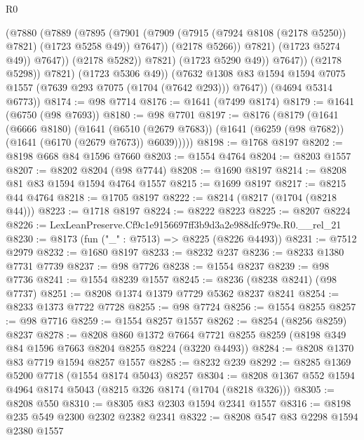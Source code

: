 \begin{lexlean}{R0}
\begin{coremodule}
                              (@7880
                                (@7889
                                  (@7895
                                    (@7901
                                      (@7909
                                        (@7915 (@7924 @8108 (@2178 @5250)) @7821)
                                        (@1723 @5258 @49))
                                      @7647))
                                  (@2178 @5266))
                                @7821)
                              (@1723 @5274 @49))
                            @7647))
                        (@2178 @5282))
                      @7821)
                    (@1723 @5290 @49))
                  @7647))
              (@2178 @5298))
            @7821)
          (@1723 @5306 @49))
        (@7632 @1308 @83 @1594 @1594 @7075 @1557 (@7639 @293 @7075 (@1704 (@7642 @293))) @7647))
      (@4694 @5314 @6773))
@8174 := @98 @7714
@8176 := @1641 (@7499 @8174)
@8179 := @1641 (@6750 (@98 @7693))
@8180 := @98 @7701
@8197 := @8176
    (@8179
      (@1641
        (@6666 @8180)
        (@1641
          (@6510 (@2679 @7683))
          (@1641 (@6259 (@98 @7682)) (@1641 (@6170 (@2679 @7673)) @6039)))))
@8198 := @1768 @8197
@8202 := @8198 @668 @84 @1596 @7660
@8203 := @1554 @4764
@8204 := @8203 @1557
@8207 := @8202 @8204 (@98 @7744)
@8208 := @1690 @8197
@8214 := @8208 @81 @83 @1594 @1594 @4764 @1557
@8215 := @1699 @8197
@8217 := @8215 @44 @4764
@8218 := @1705 @8197
@8222 := @8214 (@8217 (@1704 (@8218 @44)))
@8223 := @1718 @8197
@8224 := @8222 @8223
@8225 := @8207 @8224
@8226 := LexLeanPreserve.Cf9c1e9156697ff3b9d3a2e988dfc979e.R0.__rel_21
@8230 := @8173 (fun ("_" : @7513) => @8225 (@8226 @4493))
@8231 := @7512 @2979
@8232 := @1680 @8197
@8233 := @8232 @237
@8236 := @8233 @1380 @7731 @7739
@8237 := @98 @7726
@8238 := @1554 @8237
@8239 := @98 @7736
@8241 := @1554 @8239 @1557
@8245 := @8236 (@8238 @8241) (@98 @7737)
@8251 := @8208 @1374 @1379 @7729 @5362 @8237 @8241
@8254 := @8233 @1373 @7722 @7728
@8255 := @98 @7724
@8256 := @1554 @8255
@8257 := @98 @7716
@8259 := @1554 @8257 @1557
@8262 := @8254 (@8256 @8259) @8237
@8278 := @8208
    @860
    @1372
    @7664
    @7721
    @8255
    @8259
    (@8198 @349 @84 @1596 @7663 @8204 @8255 @8224 (@3220 @4493))
@8284 := @8208 @1370 @83 @7719 @1594 @8257 @1557
@8285 := @8232 @239
@8292 := @8285 @1369 @5200 @7718 (@1554 @8174 @5043) @8257
@8304 := @8208 @1367 @552 @1594 @4964 @8174 @5043 (@8215 @326 @8174 (@1704 (@8218 @326)))
@8305 := @8208 @550
@8310 := @8305 @83 @2303 @1594 @2341 @1557
@8316 := @8198 @235 @549 @2300 @2302 @2382 @2341
@8322 := @8208 @547 @83 @2298 @1594 @2380 @1557

\end{coremodule}
\end{lexlean}
